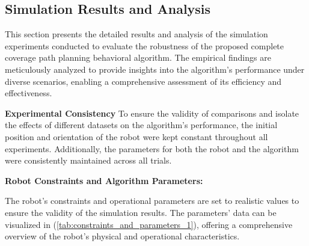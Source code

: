 
        


\subsection{Simulation Results and Analysis}

This section presents the detailed results and analysis of the simulation experiments conducted to evaluate the robustness of the proposed complete coverage path planning behavioral algorithm. The empirical findings are meticulously analyzed to provide insights into the algorithm's performance under diverse scenarios, enabling a comprehensive assessment of its efficiency and effectiveness. 

\vspace*{6mm}  

\textbf{Experimental Consistency}
To ensure the validity of comparisons and isolate the effects of different datasets on the algorithm's performance, the initial position and orientation of the robot were kept constant throughout all experiments. Additionally, the parameters for both the robot and the algorithm were consistently maintained across all trials.


\vspace*{6mm}  

\textbf{Robot Constraints and Algorithm Parameters: } 


The robot's constraints and operational parameters are set to realistic values to ensure the validity of the simulation results. The parameters' data can be visualized in (\autoref{tab:constraints_and_parameters_1}), offering a comprehensive overview of the robot's physical and operational characteristics.

